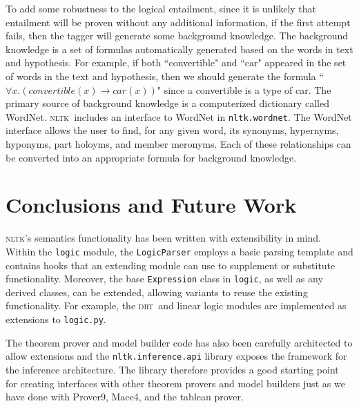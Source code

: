 \documentclass[11pt, a4paper]{article}
\newcommand{\DRT}{\textsc{drt}}
\newcommand{\NLTK}{\textsc{nltk}}
\begin{document}
To add some robustness to the logical entailment, since it is unlikely
that entailment will be proven without any additional information, if
the first attempt fails, then the tagger will generate some background
knowledge.  The background knowledge is a set of formulas
automatically generated based on the words in text and hypothesis.
For example, if both ``convertible" and ``car" appeared in the set of
words in the text and hypothesis, then we should generate the formula
``$\forall x.(convertible(x) \rightarrow car(x))$" since a convertible
is a type of car.  The primary source of background knowledge is a
computerized dictionary called WordNet.  \NLTK\ includes an interface
to WordNet in \texttt{nltk.wordnet}.  The WordNet interface allows
the user to find, for any given word, its synonyms, hypernyms,
hyponyms, part holoyms, and member meronyms.  Each of these
relationships can be converted into an appropriate formula for
background knowledge.


\section{Conclusions and Future Work}

\NLTK's semantics functionality has been written with extensibility in
mind.  Within the \texttt{logic} module, the \texttt{LogicParser}
employs a basic parsing template and contains hooks that an extending
module can use to supplement or substitute functionality.  Moreover, the
base \texttt{Expression} class in \texttt{logic}, as well as any
derived classes, can be extended, allowing variants to reuse the
existing functionality.  For example, the \DRT\ and linear logic modules
are implemented as extensions to \texttt{logic.py}.

The theorem prover and model builder code has also been carefully
architected to allow extensions and the \texttt{nltk.inference.api}
library exposes the framework for the inference architecture.  The
library therefore provides a good starting point for creating
interfaces with other theorem provers and model builders just as we
have done with Prover9, Mace4, and the tableau prover.  %
\end{document}
